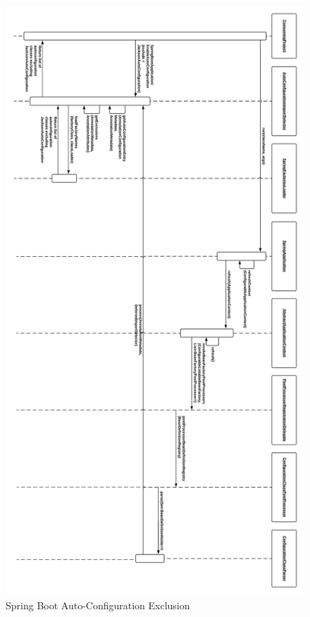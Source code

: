 \begin{figure}[H]
    \centering
    \includegraphics[width=\textwidth, height=\textheight, keepaspectratio]{content/architectural-views-top-level/auto-configuration-exclude.png}
    \caption{Spring Boot Auto-Configuration Exclusion}
    \label{sequence-diagram-auto-configuration-exclude}
\end{figure}

